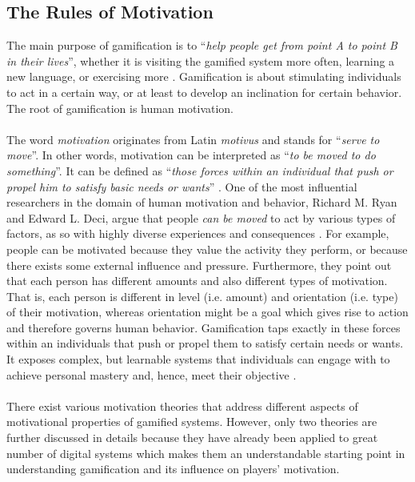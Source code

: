\subsection{The Rules of Motivation}
The main purpose of gamification is to ``\textit{help people get from point A to point B in their lives}'', whether it is visiting the gamified system more often, learning a new language, or exercising more \cite{gamificationPurpose}. Gamification is about stimulating
 individuals to act in a certain way, or at least to develop an inclination for certain behavior. The root of gamification is human motivation.\\\\The word \textit{motivation} originates from Latin \textit{motivus} and stands for ``\textit{serve to move}''. In other words, motivation can be interpreted as ``\textit{to be moved to do something}''\cite{ryan2000intrinsic}. It can be defined as ``\textit{those forces within an individual that push or propel him to satisfy basic needs or wants}'' \cite{pardee1990motivation}. One of the most influential researchers in the domain of human motivation and behavior, Richard M. Ryan and Edward L. Deci, argue that people \textit{can be moved} to act by various types of factors, as so with highly diverse experiences and consequences \cite{ryan2000intrinsic}. For example, people can be motivated because they value the activity they perform, or because there exists some external influence and pressure. Furthermore, they point out that each person has different amounts and also different types of motivation. That is, each person is different in level (i.e. amount) and orientation (i.e. type) of their motivation, whereas orientation might be a goal which gives rise to action and therefore governs human behavior. Gamification taps exactly in these forces within an individuals that push or propel them to satisfy certain needs or wants. It exposes complex, but learnable systems that individuals can engage with to achieve personal mastery and, hence, meet their objective \cite{gamificationPurpose}.\\\\
There exist various motivation theories that address different aspects of motivational properties of gamified systems. However, only two theories are further discussed in details because they have already been applied to great number of digital systems which makes them an understandable starting point in understanding gamification and its influence on players' motivation. \pagebreak

